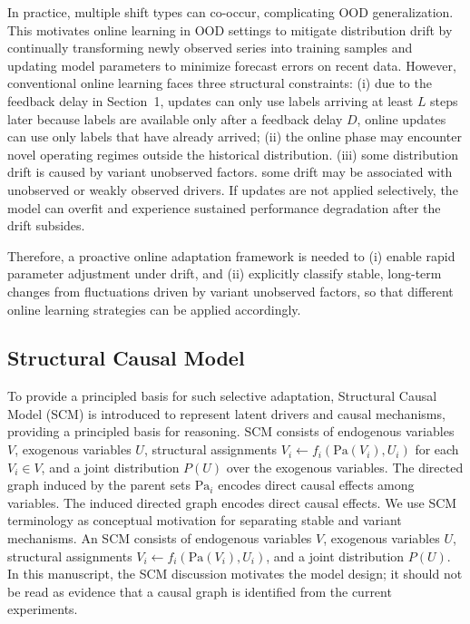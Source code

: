 ﻿\documentclass[journal]{IEEEtran}
\DeclareRobustCommand{\oldtext}[1]{{\color{revisionred}#1}}
\DeclareRobustCommand{\newtext}[1]{{\color{revisionblue}#1}}
\DeclareRobustCommand{\why}[1]{{\color{revisionblue}{\footnotesize (#1)}}}
\DeclareRobustCommand{\rw}[3]{\oldtext{#1} \newtext{#2}\why{#3}}
\begin{document}
In practice, multiple shift types can co-occur, complicating OOD generalization. This motivates online learning in OOD settings to mitigate distribution drift by continually transforming newly observed series into training samples and updating model parameters to minimize forecast errors on recent data. However, conventional online learning faces three structural constraints: (i) \rw{due to the feedback delay in Section~1, updates can only use labels arriving at least $L$ steps later}{because labels are available only after a feedback delay $D$, online updates can use only labels that have already arrived}{修复错误章节引用，并区分 lookback $L$ 与 feedback delay $D$。}; (ii) the online phase may encounter novel operating regimes outside the historical distribution. (iii) \rw{some distribution drift is caused by variant unobserved factors.}{some drift may be associated with unobserved or weakly observed drivers.}{避免在无因果识别证据时断言 drift 原因。} If updates are not applied selectively, the model can overfit and experience sustained performance degradation after the drift subsides. 

Therefore, a proactive online adaptation framework is needed to (i) enable rapid parameter adjustment under drift, and (ii) explicitly classify stable, long-term changes from fluctuations driven by variant unobserved factors, so that different online learning strategies can be applied accordingly.

\subsection{Structural Causal Model}

To provide a principled basis for such selective adaptation, \rw{Structural Causal Model (SCM) is introduced to represent latent drivers and causal mechanisms, providing a principled basis for reasoning. SCM consists of endogenous variables $V$, exogenous variables $U$, structural assignments $V_i \leftarrow f_i(\mathrm{Pa}(V_i), U_i)$ for each $V_i \in V$, and a joint distribution $P(U)$ over the exogenous variables. The directed graph induced by the parent sets $\mathrm{Pa}_i$ encodes direct causal effects among variables. The induced directed graph encodes direct causal effects.}{We use SCM terminology as conceptual motivation for separating stable and variant mechanisms. An SCM consists of endogenous variables $V$, exogenous variables $U$, structural assignments $V_i \leftarrow f_i(\mathrm{Pa}(V_i), U_i)$, and a joint distribution $P(U)$. In this manuscript, the SCM discussion motivates the model design; it should not be read as evidence that a causal graph is identified from the current experiments.}{删去重复句，并明确 SCM 是动机而非已验证的因果发现。}
\end{document}
